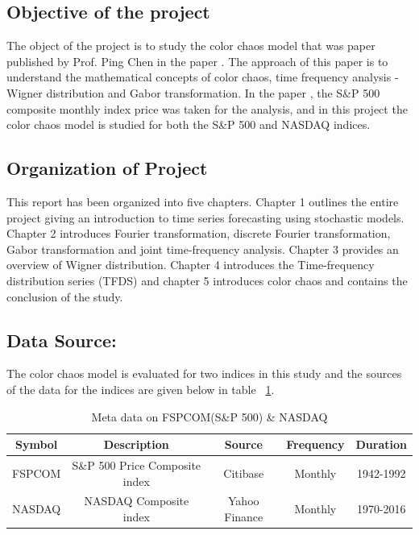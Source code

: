 \subsection{Objective of the project}
The object of the project is to study the color chaos model that was paper published by Prof. Ping Chen in the paper \cite{pchen}. The approach of this paper is to understand the mathematical concepts of color chaos, time frequency analysis - Wigner distribution and Gabor transformation.  In the paper \cite{pchen}, the S\&P 500 composite monthly index price was taken for the analysis, and in this project the color chaos model is studied for both the S\&P 500 and NASDAQ indices.

\subsection{Organization of Project}
This report has been organized into five chapters. Chapter 1 outlines the entire project giving an introduction to time series forecasting using stochastic models. Chapter 2 introduces Fourier transformation, discrete Fourier transformation, Gabor transformation and joint time-frequency analysis. Chapter 3 provides an overview of Wigner distribution. Chapter 4 introduces the Time-frequency distribution series (TFDS) and chapter 5 introduces color chaos and contains the conclusion of the study.

\subsection{Data Source:}

The color chaos model is evaluated for two indices in this study and the sources of the data for the indices are given below in table ~\ref{table:datasource}. 

\begin{table}[h!]
\centering
\begin{tabular}{||c c c c c||} 
 \hline
 Symbol & Description & Source & Frequency & Duration \\ [0.5ex] 
 \hline\hline
 FSPCOM & S\&P 500 Price Composite index & Citibase & Monthly & 1942-1992 \\ 
 NASDAQ & NASDAQ Composite index & Yahoo Finance & Monthly & 1970-2016 \\ 
 \hline
\end{tabular}
\caption{Meta data on FSPCOM(S\&P 500) \& NASDAQ}
\label{table:datasource}
\end{table}


